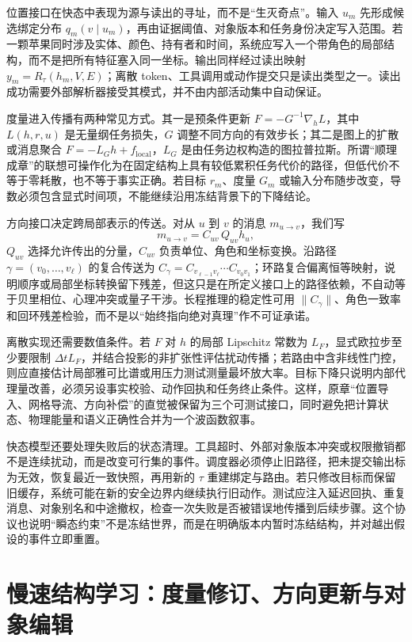 位置接口在快态中表现为源与读出的寻址，而不是“生灭奇点”。输入 $u_m$ 先形成候选绑定分布 $q_m(v\mid u_m)$，再由证据阈值、对象版本和任务身份决定写入范围。若一颗苹果同时涉及实体、颜色、持有者和时间，系统应写入一个带角色的局部结构，而不是把所有特征塞入同一坐标。输出同样经过读出映射 $y_m=R_{\tau}(h_m,V,E)$；离散 token、工具调用或动作提交只是读出类型之一。读出成功需要外部解析器接受其模式，并不由内部活动集中自动保证。

度量进入传播有两种常见方式。其一是预条件更新 $F=-G^{-1}\nabla_h L$，其中 $L(h,r,u)$ 是无量纲任务损失，$G$ 调整不同方向的有效步长；其二是图上的扩散或消息聚合 $F=-L_Gh+f_{\mathrm{local}}$，$L_G$ 是由任务边权构造的图拉普拉斯。所谓“顺理成章”的联想可操作化为在固定结构上具有较低累积任务代价的路径，但低代价不等于零耗散，也不等于事实正确。若目标 $r_m$、度量 $G_m$ 或输入分布随步改变，导数必须包含显式时间项，不能继续沿用冻结背景下的下降结论。

方向接口决定跨局部表示的传送。对从 $u$ 到 $v$ 的消息 $m_{u\to v}$，我们写
\[
m_{u\to v}=C_{uv}\,Q_{uv}h_u,
\]
$Q_{uv}$ 选择允许传出的分量，$C_{uv}$ 负责单位、角色和坐标变换。沿路径 $\gamma=(v_0,\ldots,v_\ell)$ 的复合传送为 $C_\gamma=C_{v_{\ell-1}v_\ell}\cdots C_{v_0v_1}$；环路复合偏离恒等映射，说明顺序或局部坐标转换留下残差，但这只是在所定义接口上的路径依赖，不自动等于贝里相位、心理冲突或量子干涉。长程推理的稳定性可用 $\|C_\gamma\|$、角色一致率和回环残差检验，而不是以“始终指向绝对真理”作不可证承诺。

离散实现还需要数值条件。若 $F$ 对 $h$ 的局部 Lipschitz 常数为 $L_F$，显式欧拉步至少要限制 $\Delta tL_F$，并结合投影的非扩张性评估扰动传播；若路由中含非线性门控，则应直接估计局部雅可比谱或用压力测试测量最坏放大率。目标下降只说明内部代理量改善，必须另设事实校验、动作回执和任务终止条件。这样，原章“位置导入、网格导流、方向补偿”的直觉被保留为三个可测试接口，同时避免把计算状态、物理能量和语义正确性合并为一个波函数叙事。

快态模型还要处理失败后的状态清理。工具超时、外部对象版本冲突或权限撤销都不是连续扰动，而是改变可行集的事件。调度器必须停止旧路径，把未提交输出标为无效，恢复最近一致快照，再用新的 $\tau$ 重建绑定与路由。若只修改目标而保留旧缓存，系统可能在新的安全边界内继续执行旧动作。测试应注入延迟回执、重复消息、对象别名和中途撤权，检查一次失败是否被错误地传播到后续步骤。这个协议也说明“瞬态约束”不是冻结世界，而是在明确版本内暂时冻结结构，并对越出假设的事件立即重置。

\section{慢速结构学习：度量修订、方向更新与对象编辑}
\label{sec:plastic_etching_cefe}

